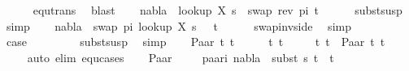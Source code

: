 \begin{isabellebody}
\ \ \ \ \isamarkupfalse%
\ equ{\isacharunderscore}{\kern0pt}trans\ \isamarkupfalse%
\ blast\isanewline
\ \ \isamarkupfalse%
\ {\isachardoublequoteopen}nabla\ {\isasymturnstile}\ {\isacharparenleft}{\kern0pt}look{\isacharunderscore}{\kern0pt}up\ X\ s{}{\isacharparenright}{\kern0pt}\ {\isasymapprox}\ swap\ {\isacharparenleft}{\kern0pt}rev\ pi{\isacharparenright}{\kern0pt}\ t{}{\isachardoublequoteclose}\isanewline
\ \ \ \ \isamarkupfalse%
\ subst{\isacharunderscore}{\kern0pt}susp\ \isamarkupfalse%
\ simp\isanewline
\ \ \isamarkupfalse%
\ {\isachardoublequoteopen}nabla\ {\isasymturnstile}\ swap\ pi\ {\isacharparenleft}{\kern0pt}look{\isacharunderscore}{\kern0pt}up\ X\ s{}{\isacharparenright}{\kern0pt}\ {\isasymapprox}\ \ t{}{\isachardoublequoteclose}\isanewline
\ \ \ \ \isamarkupfalse%
\ swap{\isacharunderscore}{\kern0pt}inv{\isacharunderscore}{\kern0pt}side\ \isamarkupfalse%
\ simp\isanewline
\ \ \ \ \isamarkupfalse%
\ \isamarkupfalse%
\ {\isacharquery}{\kern0pt}case\ \isanewline
\ \ \ \ \ \ \isamarkupfalse%
\ subst{\isacharunderscore}{\kern0pt}susp\ \isamarkupfalse%
\ simp\isanewline
{}\isamarkupfalse%
\isanewline
\ \ \isamarkupfalse%
\ {\isacharparenleft}{\kern0pt}Paar\ t{}{}\ t{}{}{\isacharparenright}{\kern0pt}\isanewline
\ \ \isamarkupfalse%
\ \isamarkupfalse%
\ t{}{}\ t{}{}\isanewline
\ \ \ \ \ t{}{\isacharcolon}{\kern0pt}\ {\isachardoublequoteopen}t{}\ {\isacharequal}{\kern0pt}\ Paar\ t{}{}\ t{}{}{\isachardoublequoteclose}\isanewline
\ \ \ \ \isamarkupfalse%
{\isacharparenleft}{\kern0pt}auto\ elim{\isacharcolon}{\kern0pt}\ equ{\isachardot}{\kern0pt}cases{\isacharparenright}{\kern0pt}\isanewline
\ \ \isamarkupfalse%
\ Paar{\isacharparenleft}{\kern0pt}{}{\isacharparenright}{\kern0pt}\ \isanewline
\ \ \isamarkupfalse%
\ paar{\isacharunderscore}{\kern0pt}i{\isacharcolon}{\kern0pt}\ {\isachardoublequoteopen}nabla\ {\isasymturnstile}\ subst\ s{}\ t{}{}\ {\isasymapprox}\ t{}{}{\isachardoublequoteclose}\isanewline

\end{isabellebody}
